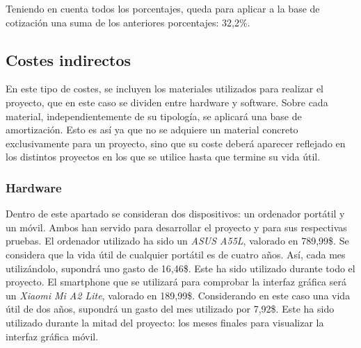 Teniendo en cuenta todos los porcentajes, queda para aplicar a la base de cotización una suma de los anteriores porcentajes: 32,2\%.

\subsection{Costes indirectos}
En este tipo de costes, se incluyen los materiales utilizados para realizar el proyecto, que en este caso se dividen entre hardware y software. Sobre cada material, independientemente de su tipología, se aplicará una base de amortización. Esto es así ya que no se adquiere un material concreto exclusivamente para un proyecto, sino que su coste deberá aparecer reflejado en los distintos proyectos en los que se utilice hasta que termine su vida útil.

\subsubsection{Hardware}
Dentro de este apartado se consideran dos dispositivos: un ordenador portátil y un móvil. Ambos han servido para desarrollar el proyecto y para sus respectivas pruebas.
El ordenador utilizado ha sido un \textit{ASUS A55L}, valorado en 789,99\$. Se considera que la vida útil de cualquier portátil es de cuatro años. Así, cada mes utilizándolo, supondrá uno gasto de 16,46\$. Este ha sido utilizado durante todo el proyecto.
El smartphone que se utilizará para comprobar la interfaz gráfica será un \textit{Xiaomi Mi A2 Lite}, valorado en 189,99\$. Considerando en este caso una vida útil de dos años, supondrá un gasto del mes utilizado por 7,92\$. Este ha sido utilizado durante la mitad del proyecto: los meses finales para visualizar la interfaz gráfica móvil.

